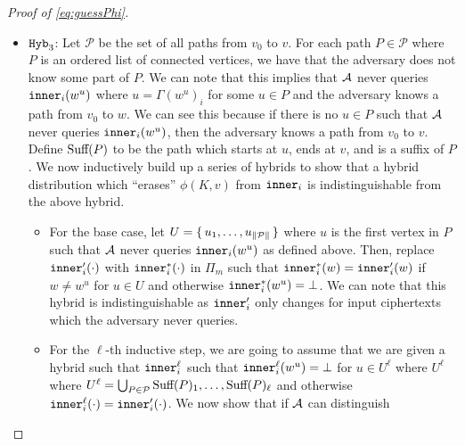 \begin{proof}[Proof of \cref{eq:guessPhi}]
\begin{itemize}
		Note that the replacement of $\Hyb_{2a}$ and $\Hyb_{2b}$ are repeated multiple times.
		Specifically, these replacements are repeated at most $\alpha$ times where $\alpha$ is the number
		of unique times $\advers$ runs $\FEDec(\SK_{\inner_i}, \phi(K, w))$.



		\item $\texttt{Hyb}_3$: Let $\mathcal{P}$ be the set of all paths from $v_0$ to $v$. For each path $P \in \mathcal{P}$
		where $P$ is an ordered list of connected vertices, we have that the adversary does not know
		some part of $P$. We can note that this implies that $\advers$ never queries
		$\texttt{inner}_i(w^u)$ where $u = \Gamma(w^u)_i$ for some $u \in P$ and the adversary knows a path from $v_0$ to $w$.
		We can see this because if there is no $u \in P$ such that $\advers$ never queries $\texttt{inner}_i(w^u)$,
		then the adversary knows a path from $v_0$ to $v$. Define $\text{Suff}(P)$ to be the path 
		which starts at $u$, ends at $v$, and is a suffix of $P$.
		We now inductively build up a series of hybrids to show that a hybrid distribution
		which ``erases'' $\phi(K, v)$ from $\texttt{inner}_i$ is indistinguishable from the above hybrid.
		\begin{itemize}
			\item For the base case, let $U = \set{u_1, \dots, u_{\|\mathcal{P}\|} }$
			where $u$ is the first vertex in $P$ such that $\advers$ never queries $\texttt{inner}_i(w^u)$ as defined above.
			Then, replace $\texttt{inner}_i'(\cdot)$ with $\texttt{inner}_i^*(\cdot)$ in $\Pi_m$ such that $\texttt{inner}_i^*(w) = \texttt{inner}_i'(w)$
			if $w \neq w^u$ for $u \in U$ and otherwise $\texttt{inner}_i^*(w^u) = \bot$. We can note that this hybrid is indistinguishable as
			$\texttt{inner}_i'$ only changes for input ciphertexts which the adversary never queries.
			\item For the $\ell$-th inductive step, we are going to assume that we are given a hybrid such that $\texttt{inner}_i^\ell$ such that $\texttt{inner}_i^\ell(w^u) = \bot$
			for $u \in U^\ell$ where $U^\ell$ where $U^\ell = \bigcup_{P \in \mathcal{P}} \text{Suff}(P)_1, \dots, \text{Suff}(P)_\ell$
			and otherwise $\texttt{inner}_i^\ell(\cdot) = \texttt{inner}_i'(\cdot)$. We now show that if $\advers$ can distinguish

\end{itemize}
\end{itemize}
\end{proof}
